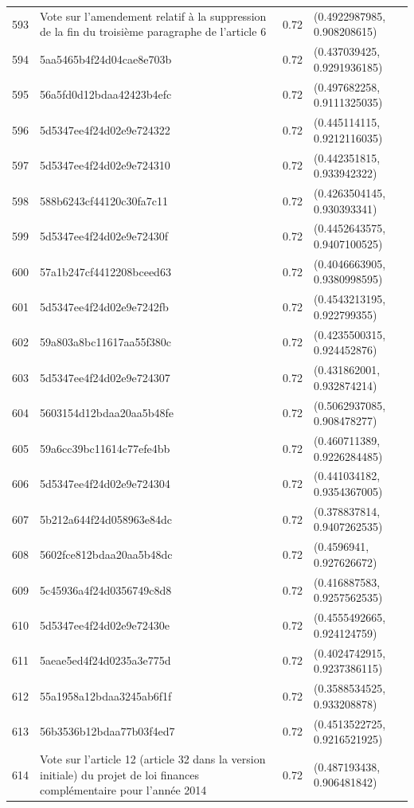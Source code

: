 \begin{table}[ht]
\begin{tabular}{rlrl}
  593 & Vote sur l'amendement relatif à la suppression de la fin du troisième paragraphe de l'article 6 & 0.72 & (0.4922987985, 0.908208615) \\ 
  594 & 5aa5465b4f24d04cae8e703b & 0.72 & (0.437039425, 0.9291936185) \\ 
  595 & 56a5fd0d12bdaa42423b4efc & 0.72 & (0.497682258, 0.9111325035) \\ 
  596 & 5d5347ee4f24d02e9e724322 & 0.72 & (0.445114115, 0.9212116035) \\ 
  597 & 5d5347ee4f24d02e9e724310 & 0.72 & (0.442351815, 0.933942322) \\ 
  598 & 588b6243cf44120c30fa7c11 & 0.72 & (0.4263504145, 0.930393341) \\ 
  599 & 5d5347ee4f24d02e9e72430f & 0.72 & (0.4452643575, 0.9407100525) \\ 
  600 & 57a1b247cf4412208bceed63 & 0.72 & (0.4046663905, 0.9380998595) \\ 
  601 & 5d5347ee4f24d02e9e7242fb & 0.72 & (0.4543213195, 0.922799355) \\ 
  602 & 59a803a8bc11617aa55f380c & 0.72 & (0.4235500315, 0.924452876) \\ 
  603 & 5d5347ee4f24d02e9e724307 & 0.72 & (0.431862001, 0.932874214) \\ 
  604 & 5603154d12bdaa20aa5b48fe & 0.72 & (0.5062937085, 0.908478277) \\ 
  605 & 59a6cc39bc11614c77efe4bb & 0.72 & (0.460711389, 0.9226284485) \\ 
  606 & 5d5347ee4f24d02e9e724304 & 0.72 & (0.441034182, 0.9354367005) \\ 
  607 & 5b212a644f24d058963e84dc & 0.72 & (0.378837814, 0.9407262535) \\ 
  608 & 5602fce812bdaa20aa5b48dc & 0.72 & (0.4596941, 0.927626672) \\ 
  609 & 5c45936a4f24d0356749c8d8 & 0.72 & (0.416887583, 0.9257562535) \\ 
  610 & 5d5347ee4f24d02e9e72430e & 0.72 & (0.4555492665, 0.924124759) \\ 
  611 & 5aeae5ed4f24d0235a3e775d & 0.72 & (0.4024742915, 0.9237386115) \\ 
  612 & 55a1958a12bdaa3245ab6f1f & 0.72 & (0.3588534525, 0.933208878) \\ 
  613 & 56b3536b12bdaa77b03f4ed7 & 0.72 & (0.4513522725, 0.9216521925) \\ 
  614 & Vote sur l'article 12 (article 32 dans la version initiale) du projet de loi finances complémentaire pour l'année 2014 & 0.72 & (0.487193438, 0.906481842) \\ 

\end{tabular}
\end{table}
